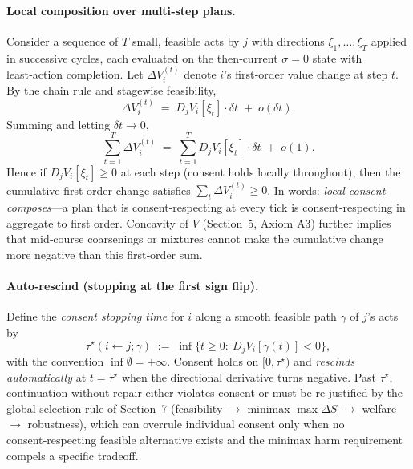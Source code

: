\documentclass[11pt]{article}
\begin{document}
\paragraph{Local composition over multi‑step plans.}
Consider a sequence of $T$ small, feasible acts by $j$ with directions $\xi_1,\dots,\xi_T$ applied in successive cycles, each evaluated on the then‑current $\sigma\!=\!0$ state with least‑action completion. Let $\Delta V_i^{(t)}$ denote $i$’s first‑order value change at step $t$. By the chain rule and stagewise feasibility,
\[
\Delta V_i^{(t)}\;=\;D_j V_i[\xi_t]\cdot \delta t\;+\;o(\delta t).
\]
Summing and letting $\delta t\to 0$,
\begin{equation}
\sum_{t=1}^T \Delta V_i^{(t)}
\;=\;
\sum_{t=1}^T D_j V_i[\xi_t]\cdot \delta t\;+\;o(1).
\label{eq:sum-consent}
\end{equation}
Hence if $D_j V_i[\xi_t]\ge 0$ at each step (consent holds locally throughout), then the cumulative first‑order change satisfies $\sum_t \Delta V_i^{(t)}\ge 0$. In words: \emph{local consent composes}—a plan that is consent‑respecting at every tick is consent‑respecting in aggregate to first order. Concavity of $V$ (Section~5, Axiom A3) further implies that mid‑course coarsenings or mixtures cannot make the cumulative change more negative than this first‑order sum.

\paragraph{Auto‑rescind (stopping at the first sign flip).}
Define the \emph{consent stopping time} for $i$ along a smooth feasible path $\gamma$ of $j$’s acts by
\[
\tau^\star(i\!\leftarrow\! j;\gamma)\;:=\;\inf\big\{t\ge 0:\ D_j V_i[\dot\gamma(t)]<0\big\},
\]
with the convention $\inf\emptyset=+\infty$. Consent holds on $[0,\tau^\star)$ and \emph{rescinds automatically} at $t=\tau^\star$ when the directional derivative turns negative. Past $\tau^\star$, continuation without repair either violates consent or must be re‑justified by the global selection rule of Section~7 (feasibility $\rightarrow$ minimax $\max\Delta S$ $\rightarrow$ welfare $\rightarrow$ robustness), which can overrule individual consent only when no consent‑respecting feasible alternative exists and the minimax harm requirement compels a specific tradeoff.
\end{document}
